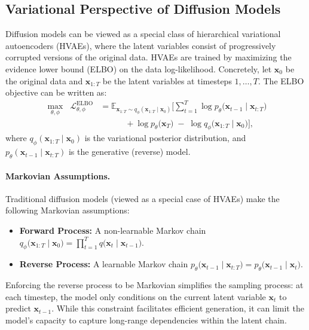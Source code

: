 \subsection{Variational Perspective of Diffusion Models}
Diffusion models can be viewed as a special class of hierarchical variational autoencoders (HVAEs), where the latent variables consist of progressively corrupted versions of the original data. HVAEs are trained by maximizing the evidence lower bound (ELBO) on the data log-likelihood. Concretely, let \(\mathbf{x}_0\) be the original data and \(\mathbf{x}_{1:T}\) be the latent variables at timesteps \(1,\dots,T\). The ELBO objective can be written as:
\begin{align}
    \max_{\theta, \phi} \;\; \mathcal{L}_{\theta, \phi}^{\mathrm{ELBO}} 
    &= \mathbb{E}_{\mathbf{x}_{1: T} \sim q_\phi(\mathbf{x}_{1: T} \mid \mathbf{x}_0)} \Bigg[ 
        \sum_{t=1}^T \log p_\theta\bigl(\mathbf{x}_{t-1} \mid \mathbf{x}_{t:T}\bigr) \nonumber \\
        & \qquad\quad + \log p_\theta\bigl(\mathbf{x}_T\bigr)
         \;-\; \log q_\phi\bigl(\mathbf{x}_{1:T} \mid \mathbf{x}_0\bigr) 
    \Bigg],
\end{align}
where \(q_\phi(\mathbf{x}_{1:T} \mid \mathbf{x}_0)\) is the variational posterior distribution, and \(p_\theta(\mathbf{x}_{t-1} \mid \mathbf{x}_{t:T})\) is the generative (reverse) model.

\paragraph{Markovian Assumptions.}
Traditional diffusion models (viewed as a special case of HVAEs) make the following Markovian assumptions:
\vspace{-0.5em}
\begin{itemize}
    \item \textbf{Forward Process:} 
    A non-learnable Markov chain \(q_\phi\bigl(\mathbf{x}_{1:T} \mid \mathbf{x}_0\bigr)=\prod_{t=1}^T q\bigl(\mathbf{x}_{t} \mid \mathbf{x}_{t-1}\bigr)\).
    \item \textbf{Reverse Process:} 
    A learnable Markov chain \(p_\theta\bigl(\mathbf{x}_{t-1} \mid \mathbf{x}_{t:T}\bigr)\!=\!p_\theta\bigl(\mathbf{x}_{t-1} \mid \mathbf{x}_{t}\bigr)\).
\end{itemize}
\vspace{-0.5em}
Enforcing the reverse process to be Markovian simplifies the sampling process: at each timestep, the model only conditions on the current latent variable \(\mathbf{x}_t\) to predict \(\mathbf{x}_{t-1}\). While this constraint facilitates efficient generation, it can limit the model's capacity to capture long-range dependencies within the latent chain. %



